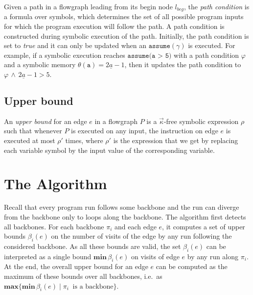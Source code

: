 \documentclass[10pt,a4paper]{article}
\newcommand{\var}[1]{\texttt{#1}}
\newcommand{\sym}[1]{\ensuremath{\underline{#1}}}
\newcommand{\maxim}{\ensuremath{\mathbf{max}}}
\newcommand{\minim}{\ensuremath{\mathbf{min}}}
\begin{document}
Given a path in a flowgraph leading from its begin node $l_\mathit{beg}$,
the \emph{path condition} is a formula over symbols, which determines the
set of all possible program inputs for which the program execution will
follow the path. A path condition is constructed during symbolic execution
of the path. Initially, the path condition is set to \textit{true} and it
can only be updated when an $\texttt{assume}(\gamma)$ is executed. For
example, if a symbolic execution reaches $\texttt{assume(a > 5)}$ with a
path condition $\varphi$ and a symbolic memory $\theta(\var{a}) =
2\sym{a}-1$, then it updates the path condition to
$\varphi\,\wedge\,2\sym{a}-1 > 5$.

\subsection{Upper bound}
\label{sec:upperbound}

An \emph{upper bound} for an edge $e$ in a flowgraph $P$ is a
$\vec{\kappa}$-free symbolic expression $\rho$ such that whenever $P$ is executed on any input, the instruction on edge $e$
is executed at most $\rho'$ times, where $\rho'$ is the expression that we
get by replacing each variable symbol by the input value of the
corresponding variable.



\section{The Algorithm}\label{sec:alg}

Recall that every program run follows some backbone and the run can diverge
from the backbone only to loops along the backbone. The algorithm first
detects all backbones. For each backbone $\pi_i$ and each edge $e$, it
computes a set of upper bounds $\beta_i(e)$ on the number of visits of the
edge by any run following the considered backbone. As all these bounds are
valid, the set $\beta_i(e)$ can be interpreted as a single bound
$\minim\,\beta_i(e)$ on visits of edge $e$ by any run along $\pi_i$. At the
end, the overall upper bound for an edge $e$ can be computed as the maximum of
these bounds over all backbones, i.e.~as
$\maxim\{\minim\,\beta_i(e)\mid \pi_i~\text{ is a backbone}\}$.
 
\end{document}
